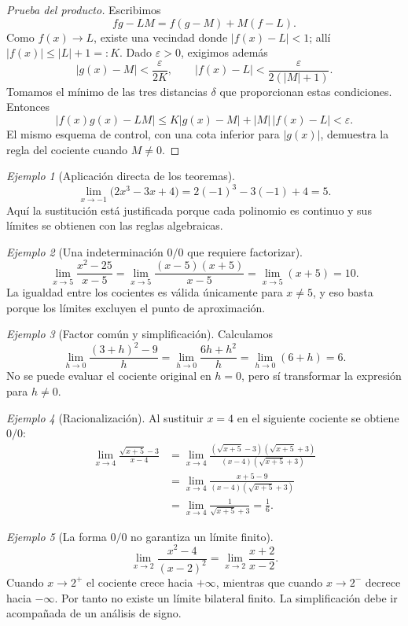 \documentclass[12pt]{article}
\theoremstyle{remark}
\newtheorem{ejemplo}{Ejemplo}
\begin{document}
\begin{proof}[Prueba del producto]
Escribimos
\[
 fg-LM=f(g-M)+M(f-L).
\]
Como $f(x)\to L$, existe una vecindad donde $|f(x)-L|<1$; allí $|f(x)|\le |L|+1=:K$. Dado $\varepsilon>0$, exigimos además
\[
 |g(x)-M|<\frac{\varepsilon}{2K},\qquad
 |f(x)-L|<\frac{\varepsilon}{2(|M|+1)}.
\]
Tomamos el mínimo de las tres distancias $\delta$ que proporcionan estas condiciones. Entonces
\[
 |f(x)g(x)-LM|\le K|g(x)-M|+|M|\,|f(x)-L|<\varepsilon.
\]
El mismo esquema de control, con una cota inferior para $|g(x)|$, demuestra la regla del cociente cuando $M\ne0$.
\end{proof}

\begin{ejemplo}[Aplicación directa de los teoremas]
\[
 \lim_{x\to-1}\bigl(2x^3-3x+4\bigr)=2(-1)^3-3(-1)+4=\boxed5.
\]
Aquí la sustitución está justificada porque cada polinomio es continuo y sus límites se obtienen con las reglas algebraicas.
\end{ejemplo}

\begin{ejemplo}[Una indeterminación $0/0$ que requiere factorizar]
\[
 \lim_{x\to5}\frac{x^2-25}{x-5}
 =\lim_{x\to5}\frac{(x-5)(x+5)}{x-5}
 =\lim_{x\to5}(x+5)=\boxed{10}.
\]
La igualdad entre los cocientes es válida únicamente para $x\ne5$, y eso basta porque los límites excluyen el punto de aproximación.
\end{ejemplo}

\begin{ejemplo}[Factor común y simplificación]
Calculamos
\[
 \lim_{h\to0}\frac{(3+h)^2-9}{h}=
 \lim_{h\to0}\frac{6h+h^2}{h}
 =\lim_{h\to0}(6+h)=\boxed6.
\]
No se puede evaluar el cociente original en $h=0$, pero sí transformar la expresión para $h\ne0$.
\end{ejemplo}

\begin{ejemplo}[Racionalización]
Al sustituir $x=4$ en el siguiente cociente se obtiene $0/0$:
\begin{align*}
 \lim_{x\to4}\frac{\sqrt{x+5}-3}{x-4}
 &=\lim_{x\to4}\frac{(\sqrt{x+5}-3)(\sqrt{x+5}+3)}{(x-4)(\sqrt{x+5}+3)}\\
 &=\lim_{x\to4}\frac{x+5-9}{(x-4)(\sqrt{x+5}+3)}\\
 &=\lim_{x\to4}\frac1{\sqrt{x+5}+3}=\boxed{\frac16}.
\end{align*}
\end{ejemplo}

\begin{ejemplo}[La forma $0/0$ no garantiza un límite finito]
\[
 \lim_{x\to2}\frac{x^2-4}{(x-2)^2}
 =\lim_{x\to2}\frac{x+2}{x-2}.
\]
Cuando $x\to2^+$ el cociente crece hacia $+\infty$, mientras que cuando $x\to2^-$ decrece hacia $-\infty$. Por tanto no existe un límite bilateral finito. La simplificación debe ir acompañada de un análisis de signo.
\end{ejemplo}
\end{document}
